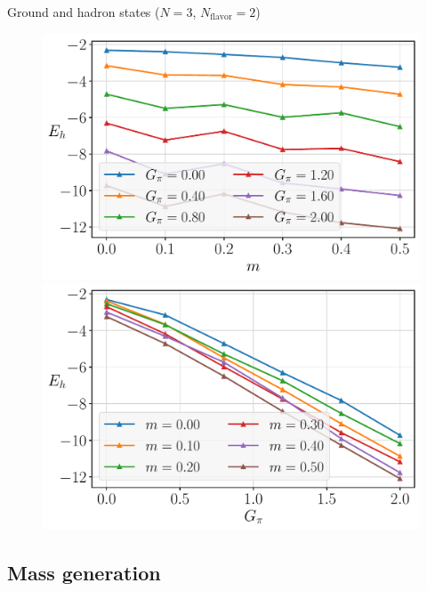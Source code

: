 \begin{frame}{Ground and hadron states ($N=3$, $N_\text{flavor}=2$)}
  \begin{figure}[!p]
  	\centering
  	\begin{minipage}[c]{.40\linewidth}
  		\centering
  		\includegraphics[width=\linewidth]{Figures/chapter06/g-Eh-curves}
  	\end{minipage}
    \hspace{.025\linewidth}
  	\begin{minipage}[c]{.40\linewidth}
  		\centering
  		\includegraphics[width=\linewidth]{Figures/chapter06/m-Eh-curves}
  	\end{minipage}
  \end{figure}

\end{frame}

\subsection{Mass generation}

